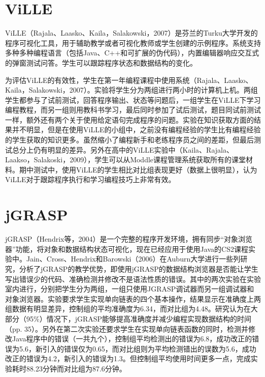 \section{ViLLE}
\begin{sectext}
ViLLE（Rajala、Laasko、Kaila，Salakowski，2007）是芬兰的Turku大学开发的程序可视化工具，用于辅助教学或者可视化教师或学生创建的示例程序。系统支持多种多种编程语言（包括Java、C++和可扩展的伪代码），内置编辑器响应交互式的弹窗测试问答。学生可以跟踪程序状态和数据结构的变化。

为评估ViLLE的有效性，学生在第一年编程课程中使用系统（Rajala、Laasko、Kaila，Salakowski，2007）。实验将学生分为两组进行两小时的计算机上机。两组学生都参与了试前测试，回答程序输出、状态等问题后，一组学生在ViLLE下学习编程教程，而另一组则用教科书学习，最后同时参加了试后测试，题目同试前测试一样，额外还有两个关于使用给定语句完成程序的问题。实验在知识获取方面的结果并不明显，但是在使用ViLLE的小组中，之前没有编程经验的学生比有编程经验的学生获取的知识更多。虽然缩小了编程新手和老练程序员之间的差距，但最后测试总分上仍有明显的差异。另外在高中的ViLLE实验中（Kaila、Rajala、Laakso，Salakoski，2009），学生可以从Moddle课程管理系统获取所有的课堂材料。期中测试中，使用ViLLE的学生相比对比组表现更好（数据上很明显），认为ViLLE对于跟踪程序执行和学习编程技巧上非常有效。
\end{sectext}
\section{jGRASP}
\begin{sectext}
jGRASP（Hendrix等，2004）是一个完整的程序开发环境，拥有同步``对象浏览器''功能，将对象和数据结构状态可视化，现在已经应用于使用Java的CS2课程实验中。Jain、Cross、Hendrix和Barowski（2006）在Auburn大学进行一些列研究，分析了jGRASP的教学优势，即使用jGRASP的数据结构浏览器是否能让学生写出错误少的代码、准确检测并修改不是语法性质的错误。其中的两次实验在实验室内进行，分别把学生分为两组，一组只使用JGRASP调试器而另一组调试器和对象浏览器。实验要求学生实现单向链表的四个基本操作，结果显示在准确度上两组数据有明显差异，控制组的平均准确度为6.34，而对比组为4.48。研究认为在大部分（95\%）情况下，jGRASP能够提高准确度并减少编程实现数据结构的时间（pp. 35）。另外在第二次实验还要求学生在实现单向链表函数的同时，检测并修改Java程序中的错误（一共九个），控制组平均检测出的错误为6.8，成功改正的错误为5.6，新引入的错误仅为0.65，而对比组则为平均检测错出的误数为5.6，成功改正的错误为4.2，新引入的错误为1.3。但控制组平均使用时间更多一点，完成实验耗时88.23分钟而对比组为87.6分钟。
\end{sectext}

